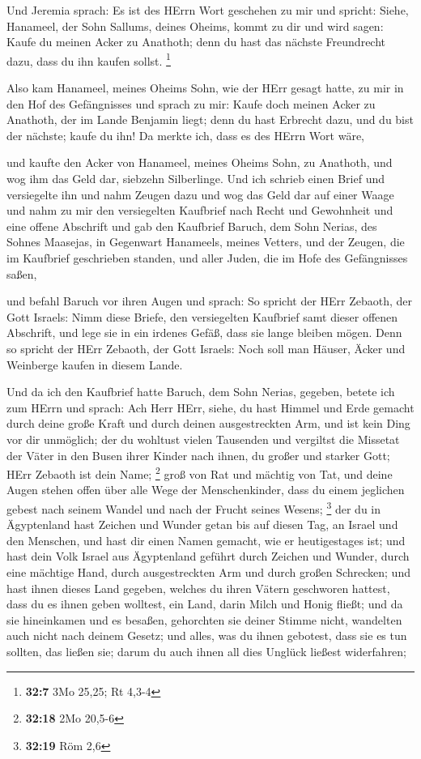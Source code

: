  Und Jeremia sprach: Es ist des HErrn Wort geschehen zu mir
und spricht:  Siehe, Hanameel, der Sohn Sallums, deines
Oheims, kommt zu dir und wird sagen: Kaufe du meinen Acker zu Anathoth;
denn du hast das nächste Freundrecht dazu, dass du ihn kaufen sollst.
\footnote{\textbf{32:7} 3Mo 25,25; Rt 4,3-4}

 Also kam Hanameel, meines Oheims Sohn, wie der HErr gesagt
hatte, zu mir in den Hof des Gefängnisses und sprach zu mir: Kaufe doch
meinen Acker zu Anathoth, der im Lande Benjamin liegt; denn du hast
Erbrecht dazu, und du bist der nächste; kaufe du ihn! Da merkte ich,
dass es des HErrn Wort wäre,

 und kaufte den Acker von Hanameel, meines Oheims Sohn, zu
Anathoth, und wog ihm das Geld dar, siebzehn Silberlinge. 
Und ich schrieb einen Brief und versiegelte ihn und nahm Zeugen dazu und
wog das Geld dar auf einer Waage  und nahm zu mir den
versiegelten Kaufbrief nach Recht und Gewohnheit und eine offene
Abschrift  und gab den Kaufbrief Baruch, dem Sohn Nerias,
des Sohnes Maasejas, in Gegenwart Hanameels, meines Vetters, und der
Zeugen, die im Kaufbrief geschrieben standen, und aller Juden, die im
Hofe des Gefängnisses saßen,

 und befahl Baruch vor ihren Augen und sprach:
 So spricht der HErr Zebaoth, der Gott Israels: Nimm diese
Briefe, den versiegelten Kaufbrief samt dieser offenen Abschrift, und
lege sie in ein irdenes Gefäß, dass sie lange bleiben mögen.
 Denn so spricht der HErr Zebaoth, der Gott Israels: Noch
soll man Häuser, Äcker und Weinberge kaufen in diesem Lande.

 Und da ich den Kaufbrief hatte Baruch, dem Sohn Nerias,
gegeben, betete ich zum HErrn und sprach:  Ach Herr HErr,
siehe, du hast Himmel und Erde gemacht durch deine große Kraft und durch
deinen ausgestreckten Arm, und ist kein Ding vor dir unmöglich;
 der du wohltust vielen Tausenden und vergiltst die
Missetat der Väter in den Busen ihrer Kinder nach ihnen, du großer und
starker Gott; HErr Zebaoth ist dein Name; \footnote{\textbf{32:18} 2Mo
  20,5-6}  groß von Rat und mächtig von Tat, und deine
Augen stehen offen über alle Wege der Menschenkinder, dass du einem
jeglichen gebest nach seinem Wandel und nach der Frucht seines Wesens;
\footnote{\textbf{32:19} Röm 2,6}  der du in Ägyptenland
hast Zeichen und Wunder getan bis auf diesen Tag, an Israel und den
Menschen, und hast dir einen Namen gemacht, wie er heutigestages ist;
 und hast dein Volk Israel aus Ägyptenland geführt durch
Zeichen und Wunder, durch eine mächtige Hand, durch ausgestreckten Arm
und durch großen Schrecken;  und hast ihnen dieses Land
gegeben, welches du ihren Vätern geschworen hattest, dass du es ihnen
geben wolltest, ein Land, darin Milch und Honig fließt; 
und da sie hineinkamen und es besaßen, gehorchten sie deiner Stimme
nicht, wandelten auch nicht nach deinem Gesetz; und alles, was du ihnen
gebotest, dass sie es tun sollten, das ließen sie; darum du auch ihnen
all dies Unglück ließest widerfahren;

